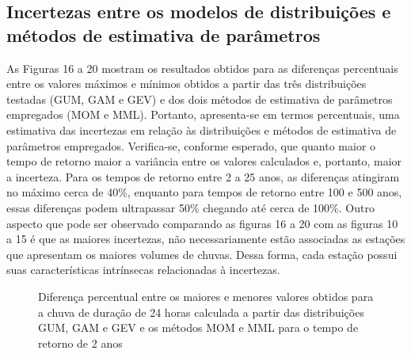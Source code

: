 \documentclass[
]{agujournal2019}
\begin{document}
\subsection{Incertezas entre os modelos de distribuições e métodos de
estimativa de
parâmetros}\label{incertezas-entre-os-modelos-de-distribuiuxe7uxf5es-e-muxe9todos-de-estimativa-de-paruxe2metros-1}

As Figuras 16 a 20 mostram os resultados obtidos para as diferenças
percentuais entre os valores máximos e mínimos obtidos a partir das três
distribuições testadas (GUM, GAM e GEV) e dos dois métodos de estimativa
de parâmetros empregados (MOM e MML). Portanto, apresenta-se em termos
percentuais, uma estimativa das incertezas em relação às distribuições e
métodos de estimativa de parâmetros empregados. Verifica-se, conforme
esperado, que quanto maior o tempo de retorno maior a variância entre os
valores calculados e, portanto, maior a incerteza. Para os tempos de
retorno entre 2 a 25 anos, as diferenças atingiram no máximo cerca de
40\%, enquanto para tempos de retorno entre 100 e 500 anos, essas
diferenças podem ultrapassar 50\% chegando até cerca de 100\%. Outro
aspecto que pode ser observado comparando as figuras 16 a 20 com as
figuras 10 a 15 é que as maiores incertezas, não necessariamente estão
associadas as estações que apresentam os maiores volumes de chuvas.
Dessa forma, cada estação possui suas características intrínsecas
relacionadas à incertezas.

\begin{figure}


\caption{\label{fig-Figura16}Diferença percentual entre os maiores e
menores valores obtidos para a chuva de duração de 24 horas calculada a
partir das distribuições GUM, GAM e GEV e os métodos MOM e MML para o
tempo de retorno de 2 anos}

\end{figure}%
\end{document}
